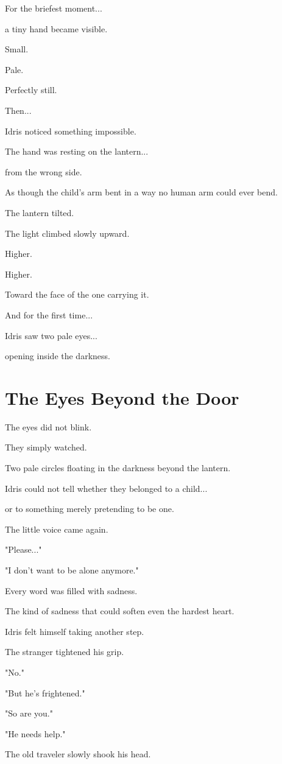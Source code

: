 \documentclass[12pt,openany]{book}
\begin{document}
For the briefest moment...

a tiny hand became visible.

Small.

Pale.

Perfectly still.

Then...

Idris noticed something impossible.

The hand was resting on the lantern...

from the wrong side.

As though the child's arm bent in a way no human arm could ever bend.

The lantern tilted.

The light climbed slowly upward.

Higher.

Higher.

Toward the face of the one carrying it.

And for the first time...

Idris saw two pale eyes...

opening inside the darkness.
\section*{The Eyes Beyond the Door}

The eyes did not blink.

They simply watched.

Two pale circles floating in the darkness beyond the lantern.

Idris could not tell whether they belonged to a child...

or to something merely pretending to be one.

The little voice came again.

"Please..."

"I don't want to be alone anymore."

Every word was filled with sadness.

The kind of sadness that could soften even the hardest heart.

Idris felt himself taking another step.

The stranger tightened his grip.

"No."

"But he's frightened."

"So are you."

"He needs help."

The old traveler slowly shook his head.
\end{document}
